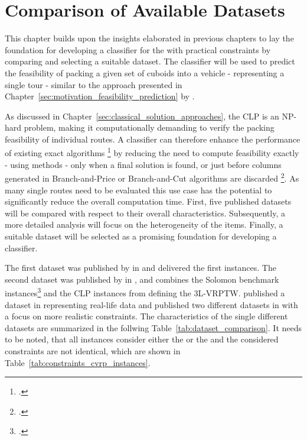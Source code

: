 \chapter{Comparison of Available Datasets}
\label{sec:dataset_selection}

This chapter builds upon the insights elaborated in previous chapters to lay the foundation
for developing a classifier for the  with practical constraints by comparing and
selecting a suitable dataset. The classifier will be used to predict the feasibility of packing a
given set of cuboids into a vehicle - representing a single tour - similar to the approach presented
in Chapter~\ref{sec:motivation_feasibility_prediction} by \citeauthor{zhang_learning-based_2022}.

As discussed in Chapter~\ref{sec:classical_solution_approaches}, the \gls{CLP} is an NP-hard problem,
making it computationally demanding to verify the packing feasibility of individual routes.
A classifier can therefore enhance the performance of existing exact algorithms \footcite[cf.][]{tamke_branch-and-cut_2024}
by reducing the need to compute feasibility exactly - using  methods - only when a
final solution is found, or just before columns generated in Branch-and-Price or Branch-and-Cut
algorithms are discarded \footcite[cf.][pp. 9--11]{zhang_learning-based_2022}. As many single routes
need to be evaluated this use case has the potential to significantly reduce the overall
computation time. First, five published  datasets will be compared with respect
to their overall characteristics. Subsequently, a more detailed analysis will focus on the
heterogeneity of the items. Finally, a suitable dataset will be selected as a promising foundation
for developing a classifier.

The first  dataset was published by \citeauthor*{gendreau_tabu_2006} in
\citeyear{gendreau_tabu_2006} and delivered the first  instances.
The second dataset was published by \citeauthor*{moura_integrated_2009} in \citeyear{moura_integrated_2009},
and combines the Solomon benchmark instances\footcite[cf.][]{solomon_algorithms_1987} and
the \gls{CLP} instances from \citeauthor*{bischoff_issues_1995} defining the \gls{3L-VRPTW}.
\citeauthor*{ceschia_local_2013} published a  dataset in \citeyear{ceschia_local_2013}
representing real-life data and \citeauthor*{krebs_advanced_2021} published two different datasets
in \citeyear{krebs_advanced_2021} with a focus on more realistic constraints. The characteristics of the
single different datasets are summarized in the follwing Table~\ref{tab:dataset_comparison}. It needs
to be noted, that all instances consider either the  or the  and the considered
constraints are not identical, which are shown in Table~\ref{tab:constraints_cvrp_instances}.

